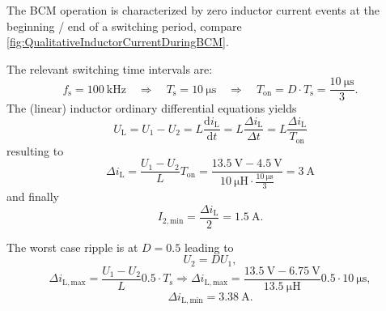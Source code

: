 \begin{solutionblock}
The BCM operation is characterized by zero inductor current events at the beginning / end of a switching period, compare \autoref{fig:QualitativeInductorCurrentDuringBCM}.

    

    The relevant switching time intervals are:
    \begin{equation}
        f_\mathrm{s} = \SI{ 100}{\kilo\hertz} \quad \Rightarrow \quad T_\mathrm{s} = \SI{ 10}{\micro\second} \quad \Rightarrow \quad T_\mathrm{on} = D \cdot T_\mathrm{s} = \frac{\SI{ 10}{\micro \second}}{3}.
    \end{equation}
    The (linear) inductor ordinary differential equations yields
    \begin{equation}
        U_\mathrm{L} = U_\mathrm{1} - U_\mathrm{2} = L \frac{\mathrm{d} i_\mathrm{L}}{\mathrm{d}t}  = L \frac{\Delta i_\mathrm{L}}{\Delta t} = L \frac{\Delta i_\mathrm{L}}{T_\mathrm{on}}
    \end{equation}
    resulting to
    \begin{equation}
        \Delta i_\mathrm{L} = \frac{U_\mathrm{1} - U_\mathrm{2}}{L} T_\mathrm{on} = \frac{\SI{13.5}{\volt} - \SI{4.5}{\volt}}{\SI{10}{\micro \henry} \cdot \frac{\SI{10}{\micro \second}}{3}} = \SI{3}{\ampere}
    \end{equation}
    and finally
    \begin{equation}
        I_{\mathrm{2,min}} = \frac{\Delta i_\mathrm{L}}{2} = \SI{1.5}{\ampere}.
    \end{equation}
\end{solutionblock}

\begin{solutionblock}
    The worst case ripple is at $D=0.5$ leading to
    \begin{equation}
        U_\mathrm{2} = D U_\mathrm{1},
    \end{equation}
    \begin{equation}
        \Delta i_\mathrm{L,max} = \frac{U_\mathrm{1} - U_\mathrm{2}}{L} 0.5 \cdot T_\mathrm{s}
        \Rightarrow \Delta i_\mathrm{L,max} = \frac{\SI{13.5}{\volt} - \SI{6.75}{\volt}}{\SI{13.5}{\micro \henry}} 0.5 \cdot \SI{10}{\micro \second},
    \end{equation}
    \begin{equation}
        \Delta i_{\mathrm{L,min}} = \SI{3.38}{\ampere}.
    \end{equation}
\end{solutionblock}

